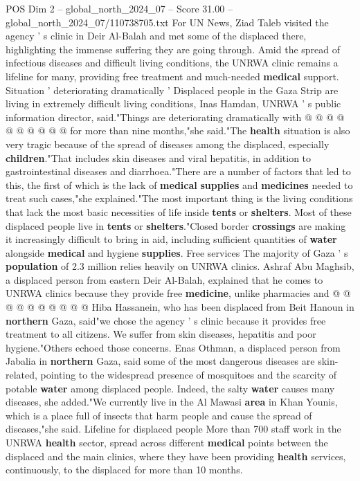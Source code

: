 \begin{textsample}{POS Dim 2 – global\_north\_2024\_07 – Score 31.00 – global\_north\_2024\_07/110738705.txt}
For UN News, Ziad Taleb visited the agency ' s clinic in Deir Al-Balah and met some of the displaced there, highlighting the immense suffering they are going through.
Amid the spread of infectious diseases and difficult living conditions, the UNRWA clinic remains a lifeline for many, providing free treatment and much-needed \textbf{medical} support.
Situation ' deteriorating dramatically ' Displaced people in the Gaza Strip are living in extremely difficult living conditions, Inas Hamdan, UNRWA ' s public information director, said."Things are deteriorating dramatically with @ @ @ @ @ @ @ @ @ @ for more than nine months,"she said."The \textbf{health} situation is also very tragic because of the spread of diseases among the displaced, especially \textbf{children}."That includes skin diseases and viral hepatitis, in addition to gastrointestinal diseases and diarrhoea."There are a number of factors that led to this, the first of which is the lack of \textbf{medical} \textbf{supplies} and \textbf{medicines} needed to treat such cases,"she explained."The most important thing is the living conditions that lack the most basic necessities of life inside \textbf{tents} or \textbf{shelters}.
Most of these displaced people live in \textbf{tents} or \textbf{shelters}."Closed border \textbf{crossings} are making it increasingly difficult to bring in aid, including sufficient quantities of \textbf{water} alongside \textbf{medical} and hygiene \textbf{supplies}.
Free services The majority of Gaza ' s \textbf{population} of 2.3 million relies heavily on UNRWA clinics.
Ashraf Abu Maghsib, a displaced person from eastern Deir Al-Balah, explained that he comes to UNRWA clinics because they provide free \textbf{medicine}, unlike pharmacies and @ @ @ @ @ @ @ @ @ @ Hiba Hassanein, who has been displaced from Beit Hanoun in \textbf{northern} Gaza, said"we chose the agency ' s clinic because it provides free treatment to all citizens.
We suffer from skin diseases, hepatitis and poor hygiene."Others echoed those concerns.
Enas Othman, a displaced person from Jabalia in \textbf{northern} Gaza, said some of the most dangerous diseases are skin-related, pointing to the widespread presence of mosquitoes and the scarcity of potable \textbf{water} among displaced people.
Indeed, the salty \textbf{water} causes many diseases, she added."We currently live in the Al Mawasi \textbf{area} in Khan Younis, which is a place full of insects that harm people and cause the spread of diseases,"she said.
Lifeline for displaced people More than 700 staff work in the UNRWA \textbf{health} sector, spread across different \textbf{medical} points between the displaced and the main clinics, where they have been providing \textbf{health} services, continuously, to the displaced for more than 10 months.

\end{textsample}
